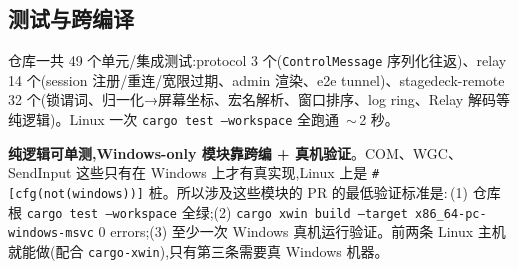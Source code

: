 \subsection{测试与跨编译}

仓库一共 49 个单元/集成测试:protocol 3 个(\texttt{ControlMessage} 序列化往返)、relay 14 个(session 注册/重连/宽限过期、admin 渲染、e2e tunnel)、stagedeck-remote 32 个(锁谓词、归一化→屏幕坐标、宏名解析、窗口排序、log ring、Relay 解码等纯逻辑)。Linux 一次 \texttt{cargo test --workspace} 全跑通 \,$\sim$\,2 秒。

\textbf{纯逻辑可单测,Windows-only 模块靠跨编 + 真机验证}。COM、WGC、SendInput 这些只有在 Windows 上才有真实现,Linux 上是 \texttt{\#[cfg(not(windows))]} 桩。所以涉及这些模块的 PR 的最低验证标准是:\,(1) 仓库根 \texttt{cargo test --workspace} 全绿;(2) \texttt{cargo xwin build --target x86\_64-pc-windows-msvc} 0 errors;(3) 至少一次 Windows 真机运行验证。前两条 Linux 主机就能做(配合 \texttt{cargo-xwin}),只有第三条需要真 Windows 机器。
